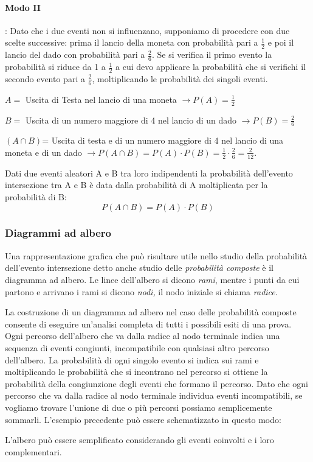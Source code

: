 \begin{esempio}
\paragraph{Modo II}: Dato che i due eventi non si influenzano, supponiamo 
di 
procedere con due scelte successive: prima il lancio della moneta con 
probabilità pari a $\frac 1 2$ e poi il lancio del dado con probabilità 
pari a 
$\frac 2 6$. Se si verifica il primo evento la probabilità si riduce da 1 a 
$\frac 1 2$ a cui devo applicare la probabilità che si verifichi il secondo 
evento pari a $\frac 2 6$, moltiplicando le probabilità dei singoli eventi.
\begin{itemize*}
\item $ A = $ Uscita di Testa nel lancio di una moneta $\to P(A)=\frac 1 2$
\item $ B = $ Uscita di un numero maggiore di 4 nel lancio di un dado $\to 
P(B)=\frac 2 6$
\item $(A\cap B)$= Uscita di testa e di un numero maggiore di 4 nel lancio 
di 
una moneta e di un dado $\to P(A\cap B)=P(A)\cdot P(B)=\frac 1 2\cdot \frac 
2 
6=\frac 2{12}$.
\end{itemize*}
\end{esempio}

\begin{teorema}
Dati due eventi aleatori A e B tra loro indipendenti la 
probabilità dell'evento intersezione tra A e B è data dalla probabilità di 
A 
moltiplicata per la probabilità di B: \[P(A\cap B)=P(A)\cdot P(B)\]
\end{teorema}

\subsubsection*{Diagrammi ad albero}
Una rappresentazione grafica che può risultare utile nello studio della 
probabilità dell'evento intersezione detto anche studio delle 
\emph{probabilità 
composte} è il diagramma ad albero. Le linee dell'albero si dicono 
\emph{rami}, 
mentre i punti da cui partono e arrivano i rami si dicono \emph{nodi,} il 
nodo 
iniziale si chiama \emph{radice}.

La costruzione di un diagramma ad albero nel caso delle probabilità 
composte 
consente di eseguire un'analisi completa di tutti i possibili esiti di una 
prova. Ogni percorso dell'albero che va dalla radice al nodo terminale 
indica 
una sequenza di eventi congiunti, incompatibile con qualsiasi altro 
percorso 
dell'albero. La probabilità di ogni singolo evento si indica sui rami e 
moltiplicando le probabilità che si incontrano nel percorso si ottiene la 
probabilità della congiunzione degli eventi che formano il percorso. Dato 
che 
ogni percorso che va dalla radice al nodo terminale individua eventi 
incompatibili, se vogliamo trovare l'unione di due o più percorsi possiamo 
semplicemente sommarli.
L'esempio precedente può essere schematizzato in questo modo:
\begin{center}
 
\end{center}
L'albero può essere semplificato considerando gli eventi coinvolti e i loro 
complementari.

